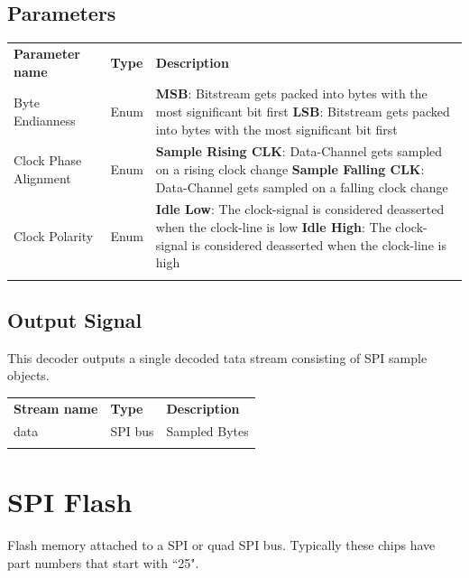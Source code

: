 \subsection{Parameters}

\begin{tabularx}{16cm}{llX}
\thickhline
\textbf{Parameter name} & \textbf{Type} & \textbf{Description} \\
\thickhline
Byte Endianness & Enum &
	\textbf{MSB}: Bitstream gets packed into bytes with the most significant bit first \newline
	\textbf{LSB}: Bitstream gets packed into bytes with the most significant bit first \\
\thinhline
Clock Phase Alignment & Enum &
	\textbf{Sample Rising CLK}: Data-Channel gets sampled on a rising clock change \newline
	\textbf{Sample Falling CLK}: Data-Channel gets sampled on a falling clock change \\
\thinhline
Clock Polarity & Enum &
	\textbf{Idle Low}: The clock-signal is considered deasserted when the clock-line is low \newline
	\textbf{Idle High}: The clock-signal is considered deasserted when the clock-line is high\\
\thickhline
\end{tabularx}

\subsection{Output Signal}

This decoder outputs a single decoded tata stream consisting of SPI sample objects.

\begin{tabularx}{16cm}{llX}
\thickhline
\textbf{Stream name} & \textbf{Type} & \textbf{Description} \\
\thickhline
data & SPI bus & Sampled Bytes \\
\thickhline
\end{tabularx}

\pagebreak
\section{SPI Flash}

Flash memory attached to a SPI or quad SPI bus. Typically these chips have part numbers that start with ``25".

